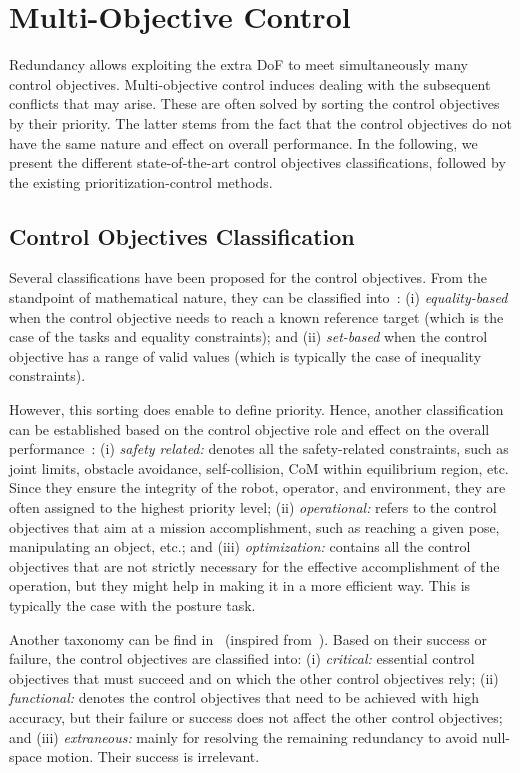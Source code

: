 \section{Multi-Objective Control}
Redundancy allows exploiting the extra DoF to meet simultaneously many control objectives. Multi-objective control induces dealing with the subsequent conflicts that may arise. These are often solved by sorting the control objectives by their priority. The latter stems from the fact that the control objectives do not have the same nature and effect on overall performance. In the following, we present the different state-of-the-art control objectives classifications, followed by the existing prioritization-control methods. 
\subsection{Control Objectives Classification}
Several classifications have been proposed for the control objectives. From the standpoint of mathematical nature, they can be classified into~\cite{diLillo2018iros}: (i) \emph{equality-based} when the control objective needs to reach a known reference target (which is the case of the tasks and equality constraints); and (ii) \emph{set-based} when the control objective has a range of valid values (which is typically the case of inequality constraints). 

However, this sorting does enable to define priority. Hence, another classification can be established based on the control objective role and effect on the overall performance~\cite{diLillo2018iros,basso2020ifac}: (i) \emph{safety related:} denotes all the safety-related constraints, such as joint limits, obstacle avoidance, self-collision, CoM within equilibrium region, etc. Since they ensure the integrity of the robot, operator, and environment, they are often assigned to the highest priority level; (ii) \emph{operational:} refers to the control objectives that aim at a mission accomplishment, such as reaching a given pose, manipulating an object, etc.; and (iii) \emph{optimization:} contains all the control objectives that are not strictly necessary for the effective accomplishment of the operation, but they might help in making it in a more efficient way. This is typically the case with the posture task. 

Another taxonomy can be find in~\cite{mistry2008humanoids} (inspired from~\cite{sentis2006icra}).  Based on their success or failure, the control objectives are classified into: (i) \emph{critical:} essential control objectives that must succeed and on which the other control objectives rely; (ii) \emph{functional:} denotes the control objectives that need to be achieved with high accuracy, but their failure or success does not affect the other control objectives; and (iii) \emph{extraneous:} mainly for resolving the remaining redundancy to avoid null-space motion. Their success is irrelevant. 

